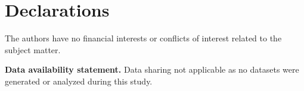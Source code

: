 \documentclass[11pt]{amsart}
\theoremstyle{definition}
\theoremstyle{remark}
\numberwithin{equation}{section}
\begin{document}
\section*{Declarations}
\footnotesize{
%
 The authors have no financial interests or conflicts of interest related to the subject matter.
\smallskip

\noindent \textbf{Data availability statement.} Data sharing not applicable as no datasets were generated or analyzed during this study.}
\end{document}
